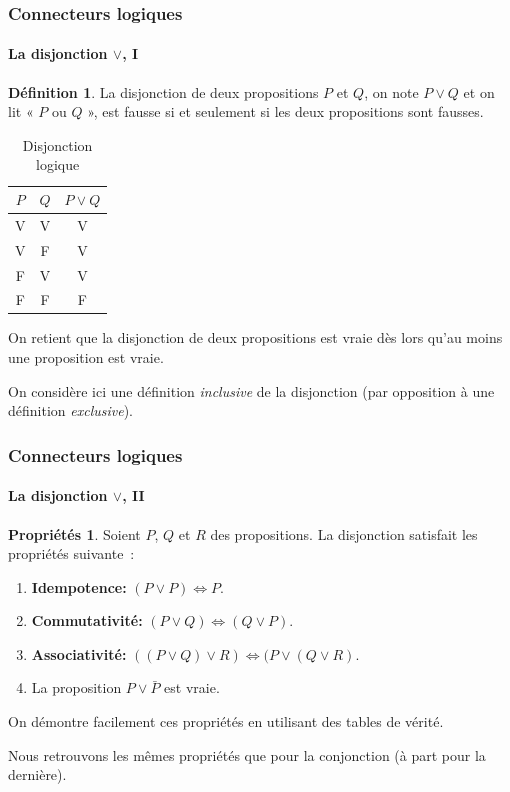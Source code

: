 \documentclass[10pt,notheorems]{beamer}
\theoremstyle{plain}
\theoremstyle{definition} %
\newtheorem{definition}{Définition}
\newtheorem{properties}{Propriétés}
\begin{document}
  \begin{frame}
    \frametitle{Connecteurs logiques}
    \framesubtitle{La disjonction $\lor$, I}

  \begin{definition}\label{def:disjonction}
    La disjonction de deux propositions $P$ et $Q$, on note $P\lor Q$
    et on lit « $P$ ou $Q$ », est fausse si et seulement si les
    deux propositions sont fausses.
  \end{definition}

  \bigskip

  \begin{table}[H]
    \centering
    \begin{tabular}[H]{|cc|c|}
      \hline
      $P$ & $Q$ & $P \lor Q$\\ \hline
      V & V & V \\
      V & F & V \\
      F & V & V \\
      F & F & F \\
      \hline\hline
    \end{tabular}
    \caption{Disjonction logique}
    \label{tab:disjonction}
  \end{table}

  \bigskip

  On retient que la disjonction de deux propositions est vraie dès
  lors qu'au moins une proposition est vraie.

  \bigskip

  On considère ici une définition \textit{inclusive} de la disjonction (par opposition à une définition \textit{exclusive}).

  \end{frame}


  \begin{frame}
    \frametitle{Connecteurs logiques}
    \framesubtitle{La disjonction $\lor$, II}

  \begin{properties}\label{properties:disjonction}
    Soient $P$, $Q$ et $R$ des propositions. La disjonction satisfait
    les propriétés suivante :
    \begin{enumerate}
    \item \textbf{Idempotence:} $(P \lor P) \Leftrightarrow P$.
    \item \textbf{Commutativité:}
      $(P \lor Q) \Leftrightarrow (Q \lor P)$.
    \item \textbf{Associativité:}
      $((P \lor Q)\lor R) \Leftrightarrow (P \lor (Q\lor R)$.
    \item La proposition $P \lor \bar P$
      est vraie.
    \end{enumerate}
  \end{properties}

  \bigskip

  On démontre facilement ces propriétés en utilisant des tables de
  vérité.\newline

  Nous retrouvons les mêmes propriétés que pour la conjonction (à part pour la dernière).

  \end{frame}
\end{document}
